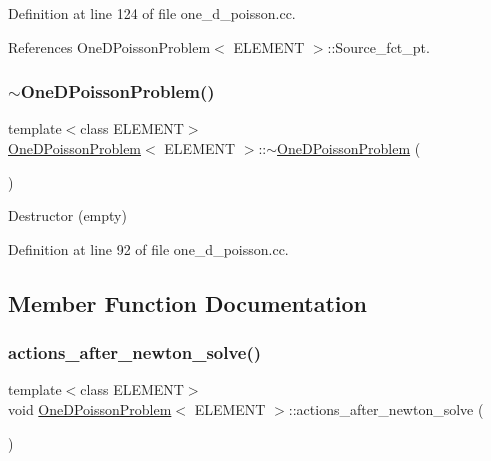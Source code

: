 Definition at line 124 of file one\+\_\+d\+\_\+poisson.\+cc.



References One\+D\+Poisson\+Problem$<$ E\+L\+E\+M\+E\+N\+T $>$\+::\+Source\+\_\+fct\+\_\+pt.

\mbox{\label{classOneDPoissonProblem_a940fa32d7939788e27b708818fb046ec}} 
\subsubsection{\texorpdfstring{$\sim$\+One\+D\+Poisson\+Problem()}{~OneDPoissonProblem()}}
{\footnotesize\ttfamily template$<$class E\+L\+E\+M\+E\+NT$>$ \\
\hyperlink{classOneDPoissonProblem}{One\+D\+Poisson\+Problem}$<$ E\+L\+E\+M\+E\+NT $>$\+::$\sim$\hyperlink{classOneDPoissonProblem}{One\+D\+Poisson\+Problem} (\begin{DoxyParamCaption}{ }\end{DoxyParamCaption})\hspace{0.3cm}{\ttfamily [inline]}}



Destructor (empty) 



Definition at line 92 of file one\+\_\+d\+\_\+poisson.\+cc.



\subsection{Member Function Documentation}
\mbox{\label{classOneDPoissonProblem_ab023d367cc68b77a7828536333c924ed}} 
\subsubsection{\texorpdfstring{actions\+\_\+after\+\_\+newton\+\_\+solve()}{actions\_after\_newton\_solve()}}
{\footnotesize\ttfamily template$<$class E\+L\+E\+M\+E\+NT$>$ \\
void \hyperlink{classOneDPoissonProblem}{One\+D\+Poisson\+Problem}$<$ E\+L\+E\+M\+E\+NT $>$\+::actions\+\_\+after\+\_\+newton\+\_\+solve (\begin{DoxyParamCaption}{ }\end{DoxyParamCaption})\hspace{0.3cm}{\ttfamily [inline]}}



